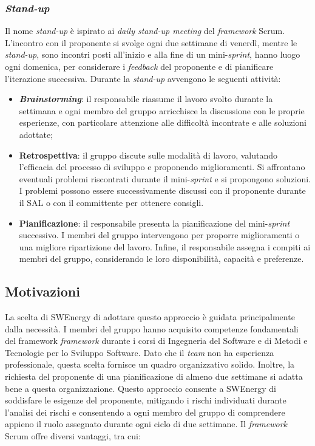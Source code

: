 \subsubsection{\textit{Stand-up}}
Il nome \textit{stand-up} è ispirato ai \textit{daily stand-up meeting} del
\textit{framework} Scrum. 
L'incontro con il proponente si svolge ogni due settimane di venerdì, 
mentre le \textit{stand-up}, sono incontri posti all'inizio e alla fine 
di un mini-\textit{sprint}, hanno luogo ogni domenica, per considerare 
i \textit{feedback} del proponente e di pianificare l'iterazione successiva.
Durante la \textit{stand-up} avvengono le seguenti attività:

\begin{itemize}
	\item \textbf{\textit{Brainstorming}}: il responsabile riassume il lavoro 
			svolto durante la settimana e ogni membro del gruppo arricchisce 
			la discussione con le proprie esperienze, con particolare attenzione 
			alle difficoltà incontrate e alle soluzioni adottate;

	\item \textbf{Retrospettiva}: il gruppo discute sulle modalità di lavoro, 
			valutando l'efficacia del processo di sviluppo e proponendo miglioramenti. 
			Si affrontano eventuali problemi riscontrati durante il mini-\textit{sprint} 
			e si propongono soluzioni. 
			I problemi possono essere successivamente discussi con il proponente 
			durante il SAL o con il committente per ottenere consigli.

	\item \textbf{Pianificazione}: il responsabile presenta la pianificazione del 
			mini-\textit{sprint} successivo. I membri del gruppo intervengono per proporre 
			miglioramenti o una migliore ripartizione del lavoro. 
			Infine, il responsabile assegna i compiti ai membri del gruppo, 
			considerando le loro disponibilità, capacità e preferenze.
\end{itemize}

\subsection{Motivazioni}
La scelta di SWEnergy di adottare questo approccio è guidata principalmente 
dalla necessità. 
I membri del gruppo hanno acquisito competenze fondamentali del framework 
\textit{framework} durante i corsi di Ingegneria del Software e di Metodi 
e Tecnologie per lo Sviluppo Software. 
Dato che il \textit{team} non ha esperienza professionale, questa scelta 
fornisce un quadro organizzativo solido. 
Inoltre, la richiesta del proponente di una pianificazione di almeno due settimane 
si adatta bene a questa organizzazione. 
Questo approccio consente a SWEnergy di soddisfare le esigenze del proponente, 
mitigando i rischi individuati durante l'analisi dei rischi e consentendo a 
ogni membro del gruppo di comprendere appieno il ruolo assegnato durante 
ogni ciclo di due settimane. 
Il \textit{framework} Scrum offre diversi vantaggi, tra cui:

